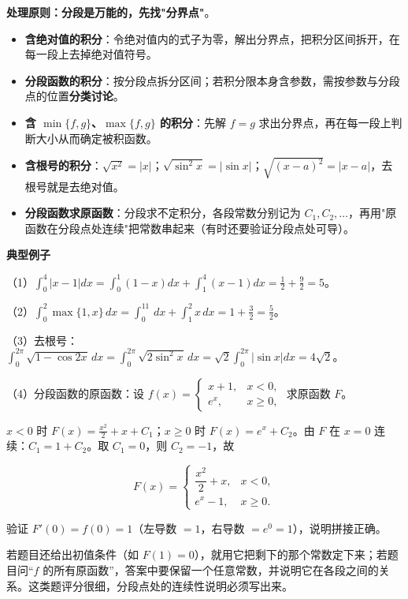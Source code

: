 \documentclass[11pt,openany,UTF8]{ctexbook}
\begin{document}
\textbf{处理原则：分段是万能的，先找"分界点"}。

\begin{itemize}
\item \textbf{含绝对值的积分}：令绝对值内的式子为零，解出分界点，把积分区间拆开，在每一段上去掉绝对值符号。
\item \textbf{分段函数的积分}：按分段点拆分区间；若积分限本身含参数，需按参数与分段点的位置\textbf{分类讨论}。
\item \textbf{含 $\min\{f,g\}$、$\max\{f,g\}$ 的积分}：先解 $f=g$ 求出分界点，再在每一段上判断大小从而确定被积函数。
\item \textbf{含根号的积分}：$\sqrt{x^2}=\lvert x\rvert$；$\sqrt{\sin^2x}=\lvert\sin x\rvert$；$\sqrt{(x-a)^2}=\lvert x-a\rvert$，去根号就是去绝对值。
\item \textbf{分段函数求原函数}：分段求不定积分，各段常数分别记为 $C_1,C_2,\dots$，再用"原函数在分段点处连续"把常数串起来（有时还要验证分段点处可导）。
\end{itemize}
\textbf{典型例子}

（1）$\displaystyle\int_0^4\lvert x-1\rvert dx=\int_0^1(1-x)dx+\int_1^4(x-1)dx=\frac{1}{2}+\frac{9}{2}=5$。

（2）$\displaystyle\int_0^2\max\{1,x\}\,dx=\int_0^11\,dx+\int_1^2x\,dx=1+\frac{3}{2}=\frac{5}{2}$。

（3）去根号：$\displaystyle\int_0^{2\pi}\sqrt{1-\cos 2x}\,dx=\int_0^{2\pi}\sqrt{2\sin^2x}\,dx=\sqrt{2}\int_0^{2\pi}\lvert\sin x\rvert dx=4\sqrt{2}$。

（4）分段函数的原函数：设 $f(x)=\begin{cases}x+1, & x<0,\\ e^{x}, & x\geq0,\end{cases}$ 求原函数 $F$。

$x<0$ 时 $F(x)=\frac{x^2}{2}+x+C_1$；$x\geq0$ 时 $F(x)=e^x+C_2$。由 $F$ 在 $x=0$ 连续：$C_1=1+C_2$。取 $C_1=0$，则 $C_2=-1$，故

\[F(x)=\begin{cases}\dfrac{x^2}{2}+x, & x<0,\\[2mm] e^{x}-1, & x\geq0.\end{cases}\]

验证 $F'(0)=f(0)=1$（左导数 $=1$，右导数 $=e^0=1$），说明拼接正确。

若题目还给出初值条件（如 $F(1)=0$），就用它把剩下的那个常数定下来；若题目问“$f$ 的所有原函数”，答案中要保留一个任意常数，并说明它在各段之间的关系。这类题评分很细，分段点处的连续性说明必须写出来。
\end{document}
